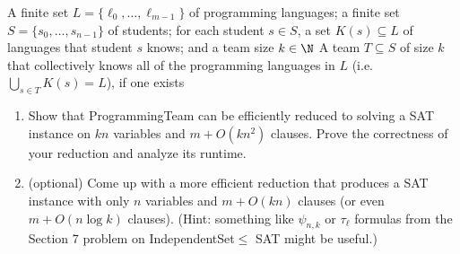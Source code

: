 \documentclass[11pt]{article}
\begin{document}
\begin{enumerate}
{A finite set $L=\{\ell_0,\ldots,\ell_{m-1}\}$ of programming languages; a finite set 
$S=\{s_0,\ldots,s_{n-1}\}$ of students; for each student $s\in S$, a set $K(s)\subseteq L$ of languages that student $s$ knows; and a team size $k\in \N$}
{A team $T\subseteq S$ of size $k$ that collectively knows all of the programming languages in $L$ (i.e. $\bigcup_{s\in T} K(s)=L$), if one exists}

\begin{enumerate}
    \item 
Show that ProgrammingTeam can be efficiently reduced to solving a SAT instance on $kn$ variables and $m+O(kn^2)$ clauses.  Prove the correctness of your reduction and analyze its runtime.

\item 
(optional\footnotemark[1])
Come up with a more efficient reduction that produces a SAT instance with only $n$ variables and $m+O(kn)$ clauses (or even $m+O(n\log k)$ clauses). (Hint: something like $\psi_{n,k}$ or $\tau_\ell$ formulas from the Section 7 problem on IndependentSet$\leq$ SAT might be useful.)
\end{enumerate}
 
\end{enumerate}
\end{document}
